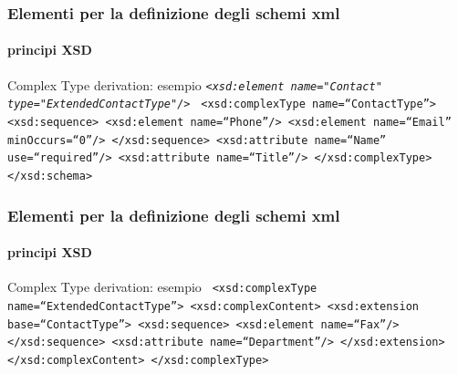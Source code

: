 %   
%  
%

\begin{frame}
	\frametitle{Elementi per la definizione degli schemi xml}
	\framesubtitle{principi XSD}
	\addtocounter{nframe}{1}

	\begin{block}{Complex Type derivation: esempio}
		\texttt{\emph{<xsd:element name="Contact" type="ExtendedContactType"/>}}
		\texttt{
			<xsd:complexType name=``ContactType''>
			<xsd:sequence>
			<xsd:element name=``Phone''/>
			<xsd:element name=``Email'' minOccurs=``0''/>
			</xsd:sequence>
			<xsd:attribute name=``Name'' use=``required''/>
			<xsd:attribute name=``Title''/>
			</xsd:complexType>
			</xsd:schema>
		}
	\end{block}
\end{frame}


\begin{frame}
	\frametitle{Elementi per la definizione degli schemi xml}
	\framesubtitle{principi XSD}
	\addtocounter{nframe}{1}

	\begin{block}{Complex Type derivation: esempio}
		\texttt{
			<xsd:complexType name=``ExtendedContactType''>
			<xsd:complexContent>
			<xsd:extension base=``ContactType''>
			<xsd:sequence>
			<xsd:element name=``Fax''/>
			</xsd:sequence>
			<xsd:attribute name=``Department''/>
			</xsd:extension>
			</xsd:complexContent>
			</xsd:complexType>
		}
	\end{block}
\end{frame}

